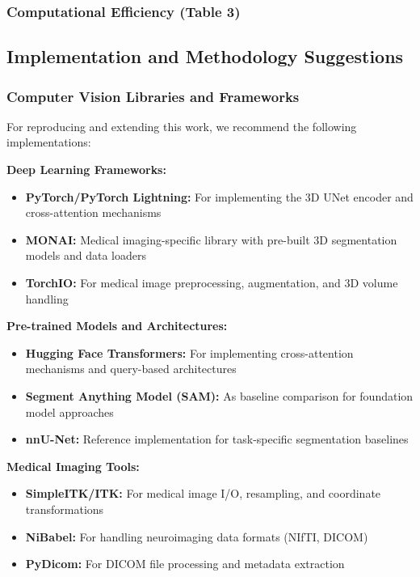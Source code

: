 
\subsubsection{Computational Efficiency (Table 3)}

\subsection{Implementation and Methodology Suggestions}
\subsubsection{Computer Vision Libraries and Frameworks}
For reproducing and extending this work, we recommend the following implementations:

\textbf{Deep Learning Frameworks:}
\begin{itemize}
    \item \textbf{PyTorch/PyTorch Lightning:} For implementing the 3D UNet encoder and cross-attention mechanisms
    \item \textbf{MONAI:} Medical imaging-specific library with pre-built 3D segmentation models and data loaders
    \item \textbf{TorchIO:} For medical image preprocessing, augmentation, and 3D volume handling
\end{itemize}

\textbf{Pre-trained Models and Architectures:}
\begin{itemize}
    \item \textbf{Hugging Face Transformers:} For implementing cross-attention mechanisms and query-based architectures
    \item \textbf{Segment Anything Model (SAM):} As baseline comparison for foundation model approaches
    \item \textbf{nnU-Net:} Reference implementation for task-specific segmentation baselines
\end{itemize}

\textbf{Medical Imaging Tools:}
\begin{itemize}
    \item \textbf{SimpleITK/ITK:} For medical image I/O, resampling, and coordinate transformations
    \item \textbf{NiBabel:} For handling neuroimaging data formats (NIfTI, DICOM)
    \item \textbf{PyDicom:} For DICOM file processing and metadata extraction
\end{itemize}

